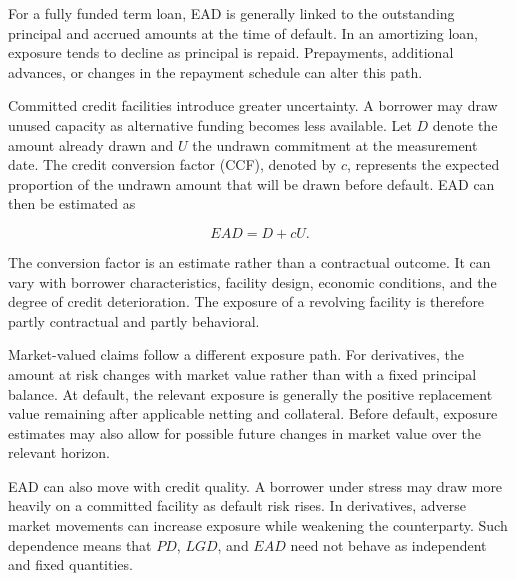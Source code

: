 For a fully funded term loan, EAD is generally linked to the outstanding principal and accrued amounts at the time of default. In an amortizing loan, exposure tends to decline as principal is repaid. Prepayments, additional advances, or changes in the repayment schedule can alter this path.

Committed credit facilities introduce greater uncertainty. A borrower may draw unused capacity as alternative funding becomes less available. Let \(D\) denote the amount already drawn and \(U\) the undrawn commitment at the measurement date. The credit conversion factor (CCF), denoted by \(c\), represents the expected proportion of the undrawn amount that will be drawn before default. EAD can then be estimated as

\begin{equation}
EAD=D+cU.
\label{eq:ch19-ead-credit-line}
\end{equation}

The conversion factor is an estimate rather than a contractual outcome. It can vary with borrower characteristics, facility design, economic conditions, and the degree of credit deterioration. The exposure of a revolving facility is therefore partly contractual and partly behavioral.

Market-valued claims follow a different exposure path. For derivatives, the amount at risk changes with market value rather than with a fixed principal balance. At default, the relevant exposure is generally the positive replacement value remaining after applicable netting and collateral. Before default, exposure estimates may also allow for possible future changes in market value over the relevant horizon.

EAD can also move with credit quality. A borrower under stress may draw more heavily on a committed facility as default risk rises. In derivatives, adverse market movements can increase exposure while weakening the counterparty. Such dependence means that \(PD\), \(LGD\), and \(EAD\) need not behave as independent and fixed quantities.

